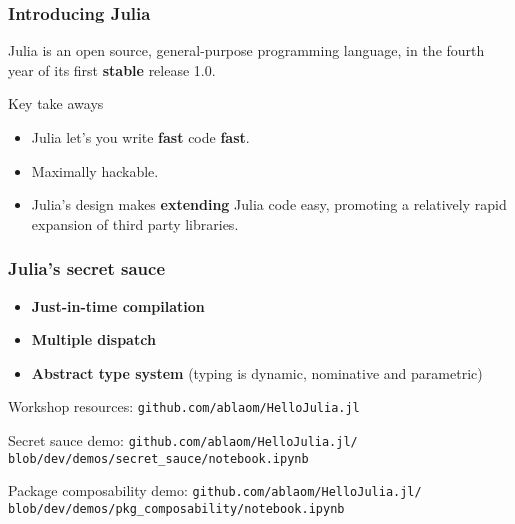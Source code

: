 \documentclass[t]{beamer}
\newcommand\df{\bf\color{Maroon}}
\begin{document}



\begin{frame}
  \frametitle{Introducing Julia}
  Julia is an open source, general-purpose programming language, in
  the fourth year of its first {\df stable} release 1.0.

  \begin{block}{Key take aways}
    \begin{itemize}
    \item Julia let's you write {\df fast}
      code {\df fast}.
    \item Maximally hackable.
    \item Julia's design makes {\df extending} Julia code easy,
      promoting a relatively rapid expansion of third party libraries.
    \end{itemize}
  \end{block}
\end{frame}

\begin{frame}
  \frametitle{Julia's secret sauce}
    \begin{itemize}
    \item {\df Just-in-time compilation}
    \item {\df Multiple dispatch}
    \item {\df Abstract type system} (typing is dynamic, nominative and parametric)
  \end{itemize}
\end{frame}

\begin{frame}
  \begin{block}{Workshop resources:}
    {\large\texttt{github.com/ablaom/HelloJulia.jl}}
    \end{block}
\end{frame}

\begin{frame}
  \begin{block}{Secret sauce demo:}
    {\large\texttt{github.com/ablaom/HelloJulia.jl/}}\newline
    {\large\texttt{blob/dev/demos/secret\_sauce/notebook.ipynb}}
    \end{block}
\end{frame}
%
\begin{frame}
  \begin{block}{Package composability demo:}
    {\large\texttt{github.com/ablaom/HelloJulia.jl/}}\newline
    {\large\texttt{blob/dev/demos/pkg\_composability/notebook.ipynb}}
    \end{block}
\end{frame}
\end{document}
